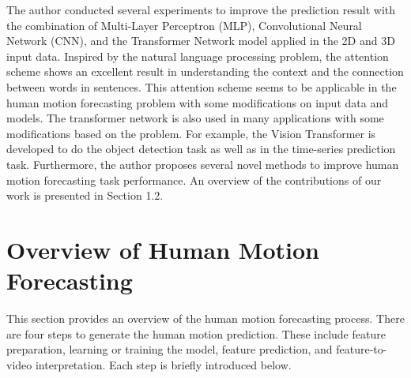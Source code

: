 The author conducted several experiments to improve the prediction result with the combination of Multi-Layer Perceptron (MLP), Convolutional Neural Network (CNN), and the Transformer Network model applied in the 2D and 3D input data. Inspired by the natural language processing problem, the attention scheme shows an excellent result in understanding the context and the connection between words in sentences\cite{vaswani2017}. This attention scheme seems to be applicable in the human motion forecasting problem with some modifications on input data and models. The transformer network is also used in many applications with some modifications based on the problem. For example, the Vision Transformer is developed to do the object detection task\cite{visionTransformer, vitae, vitaev2} as well as in the time-series prediction task\cite{neo2020}. Furthermore, the author proposes several novel methods to improve human motion forecasting task performance. An overview of the contributions of our work is presented in Section 1.2.

\section{Overview of Human Motion Forecasting}\label{1:overview}
This section provides an overview of the human motion forecasting process. There are four steps to generate the human motion prediction. These include feature preparation, learning or training the model, feature prediction, and feature-to-video interpretation. Each step is briefly introduced below.

